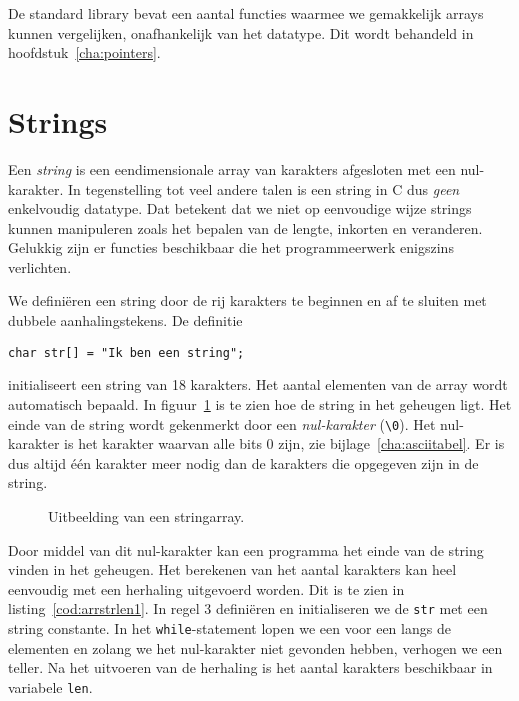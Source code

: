 De standard library bevat een aantal functies waarmee we gemakkelijk arrays kunnen vergelijken, onafhankelijk van het datatype. Dit wordt behandeld in hoofdstuk~\ref{cha:pointers}.

\section{Strings}
Een \textsl{string} is een eendimensionale array van karakters afgesloten met een nul-karakter. In tegenstelling tot veel andere talen is een string in C dus \textsl{geen} enkelvoudig datatype. Dat betekent dat we niet op eenvoudige wijze strings kunnen manipuleren zoals het bepalen van de lengte, inkorten en veranderen. Gelukkig zijn er functies beschikbaar die het programmeerwerk enigszins verlichten. 

We definiëren een string door de rij karakters te beginnen en af te sluiten met dubbele aanhalingstekens. De definitie

\hspace*{1em}\texttt{char str[] = "Ik ben een string";}

initialiseert een string van 18 karakters. Het aantal elementen van de array wordt automatisch bepaald.
In figuur~\ref{fig:arrastring} is te zien hoe de string in het geheugen ligt. Het einde van de string wordt gekenmerkt door een \textsl{nul-karakter} (\texttt{\textbackslash 0}). Het nul-karakter is het karakter waarvan alle bits 0 zijn, zie bijlage~\ref{cha:asciitabel}. Er is dus altijd één karakter meer nodig dan de karakters die opgegeven zijn in de string.

\begin{figure}[H]
\centering
{}
\caption{Uitbeelding van een stringarray.}
\label{fig:arrastring}
\end{figure}

Door middel van dit nul-karakter kan een programma het einde van de string vinden in het geheugen. Het berekenen van het aantal karakters kan heel eenvoudig met een herhaling uitgevoerd worden. Dit is te zien in listing~\ref{cod:arrstrlen1}. In regel 3 definiëren en initialiseren we de \texttt{str} met een string constante. In het \texttt{while}-statement lopen we een voor een langs de elementen en zolang we het nul-karakter niet gevonden hebben, verhogen we een teller. Na het uitvoeren van de herhaling is het aantal karakters beschikbaar in variabele \texttt{len}.

